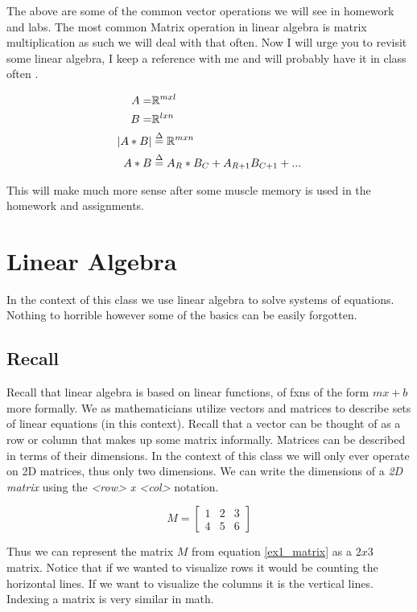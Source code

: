 \documentclass[12pt]{article}
\begin{document}
			The above are some of the common vector operations we will see in homework and labs.
			The most common Matrix operation in linear algebra is matrix multiplication as such we will deal with that often.
			Now I will urge you to revisit some linear algebra,
				I keep a reference with me and will probably have it in class often \cite{savov}.

			\begin{align*}
				A = &\mathbb{R}^{m x l} \\
				B = &\mathbb{R}^{l x n} \\
				|A * B| &\stackrel{\text{$\Delta$}}{=} \mathbb{R}^{m x n} \\
				A * B &\stackrel{\text{$\Delta$}}{=} A_R*B_C + A_{R+1}B_{C+1} + ...
			\end{align*}

			This will make much more sense after some muscle memory is used in the homework and assignments.

			\section{Linear Algebra}
				In the context of this class we use linear algebra to solve systems of equations.
				Nothing to horrible however some of the basics can be easily forgotten.
				\subsection{Recall}
					Recall that linear algebra is based on linear functions,
						of fxns of the form $mx + b$ more formally.
					We as mathematicians utilize vectors and matrices to describe sets of linear equations (in this context).
					Recall that a vector can be thought of as a row or column that makes up some matrix informally.
					Matrices can be described in terms of their dimensions.
					In the context of this class we will only ever operate on 2D matrices,
						thus only two dimensions.
					We can write the dimensions of a \textit{2D matrix} using the \textit{<row> x <col>} notation.
					
					\begin{equation} \label{ex1_matrix}
						M = \begin{bmatrix}
							1 & 2 & 3\\
							4 & 5 & 6
						\end{bmatrix}
					\end{equation}

					Thus we can represent the matrix $M$ from equation \eqref{ex1_matrix} as a $2 x 3$ matrix.
					Notice that if we wanted to visualize rows it would be counting the horizontal lines.
					If we want to visualize the columns it is the vertical lines.
					Indexing a matrix is very similar in math.
\end{document}
